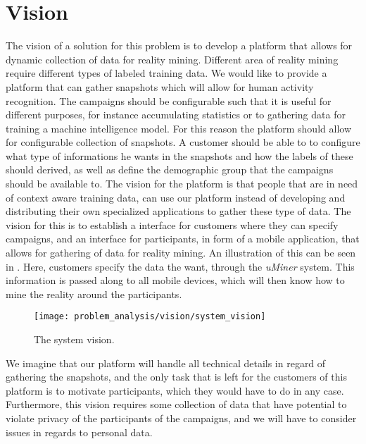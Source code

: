 \section{Vision}
\label{sec:vision}
The vision of a solution for this problem is to develop a platform that allows for dynamic collection of data for reality mining. Different area of reality mining require different types of labeled training data. We would like to provide a platform that can gather snapshots which will allow for human activity recognition. The campaigns should be configurable such that it is useful for different purposes, for instance accumulating statistics or to gathering data for training a machine intelligence model. For this reason the platform should allow for configurable collection of snapshots. A customer should be able to to configure what type of informations he wants in the snapshots and how the labels of these should derived, as well as define the demographic group that the campaigns should be available to. The vision for the platform is that people that are in need of context aware training data, can use our platform instead of developing and distributing their own specialized applications to gather these type of data. The vision for this is to establish a interface for customers where they can specify campaigns, and an interface for participants, in form of a mobile application, that allows for gathering of data for reality mining. An illustration of this can be seen in . Here, customers specify the data the want, through the \emph{uMiner} system. This information is passed along to all mobile devices, which will then know how to mine the reality around the participants. 

\begin{figure}[!htbp]
    \centering
    \texttt{[image: problem\_analysis/vision/system\_vision]}
    \caption{The system vision.}
    \label{fig:system_vision}
\end{figure}
\FloatBarrier

We imagine that our platform will handle all technical details in regard of gathering the snapshots, and the only task that is left for the customers of this platform is to motivate participants, which they would have to do in any case. Furthermore, this vision requires some collection of data that have potential to violate privacy of the participants of the campaigns, and we will have to consider issues in regards to personal data.

